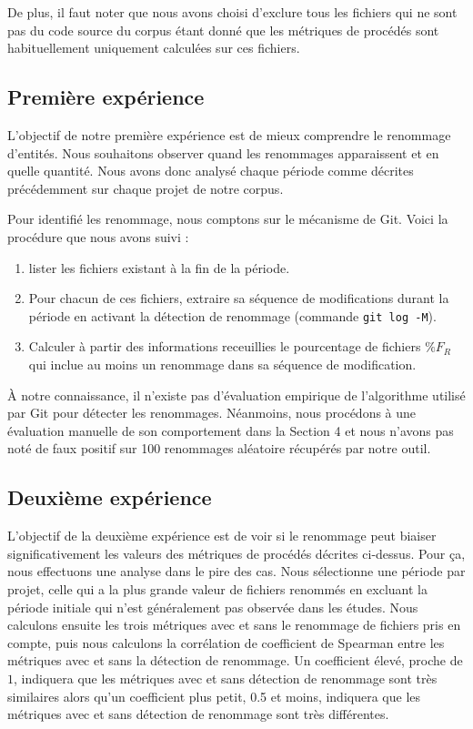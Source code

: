 De plus, il faut noter que nous avons choisi d'exclure tous les fichiers qui ne sont pas du code source du corpus étant donné que les métriques de procédés sont habituellement uniquement calculées sur ces fichiers. \\



\subsection{Première expérience}

 L'objectif de notre première expérience est de mieux comprendre le renommage d'entités. Nous souhaitons observer quand les renommages apparaissent et en quelle quantité. Nous avons donc analysé chaque période comme décrites précédemment sur chaque projet de notre corpus. 

Pour identifié les renommage, nous comptons sur le mécanisme de Git. Voici la procédure que nous avons suivi :
\begin{enumerate}
\item lister les fichiers existant à la fin de la période.
\item Pour chacun de ces fichiers, extraire sa séquence de modifications durant la période en activant la détection de renommage (commande \texttt{git log -M}).
\item Calculer à partir des informations receuillies le pourcentage de fichiers $\%F_{R}$ qui inclue au moins un renommage dans sa séquence de modification.
\end{enumerate}
\medskip

À notre connaissance, il n'existe pas d'évaluation empirique de l'algorithme utilisé par Git pour détecter les renommages. Néanmoins, nous procédons à une évaluation manuelle de son comportement dans la Section 4 et nous n'avons pas noté de faux positif sur 100 renommages aléatoire récupérés par notre outil.\\

\subsection{Deuxième expérience}

L'objectif de la deuxième expérience est de voir si le renommage peut biaiser significativement les valeurs des métriques de procédés décrites ci-dessus. Pour ça, nous effectuons une analyse dans le pire des cas. Nous sélectionne une période par projet, celle qui a la plus grande valeur de fichiers renommés en excluant la période initiale qui n'est généralement pas observée dans les études. Nous calculons ensuite les trois métriques avec et sans le renommage de fichiers pris en compte, puis nous calculons la corrélation de coefficient de Spearman entre les métriques avec et sans la détection de renommage. Un coefficient élevé, proche de $1$, indiquera que les métriques avec et sans détection de renommage sont très similaires alors qu'un coefficient plus petit, 0.5 et moins, indiquera que les métriques avec et sans détection de renommage sont très différentes.\\  
